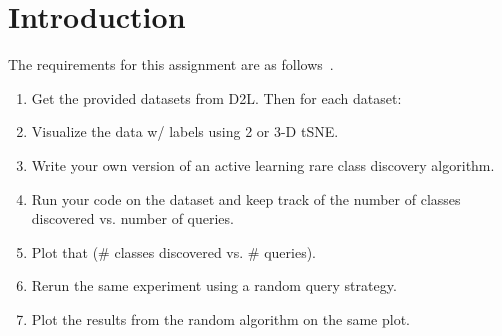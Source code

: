 \section{Introduction}

The requirements for this assignment are as follows~\cite{assignment9}.\par
\begin{enumerate}    
    \item Get the provided datasets from D2L. Then for each dataset:
    \item Visualize the data w/ labels using 2 or 3-D tSNE.
    \item Write your own version of an active learning rare class discovery algorithm.
    \item Run your code on the dataset and keep track of the number of classes discovered vs. number of
    queries.
    \item Plot that (\# classes discovered vs. \# queries).
    \item Rerun the same experiment using a random query strategy.
    \item Plot the results from the random algorithm on the same plot.    
\end{enumerate}

